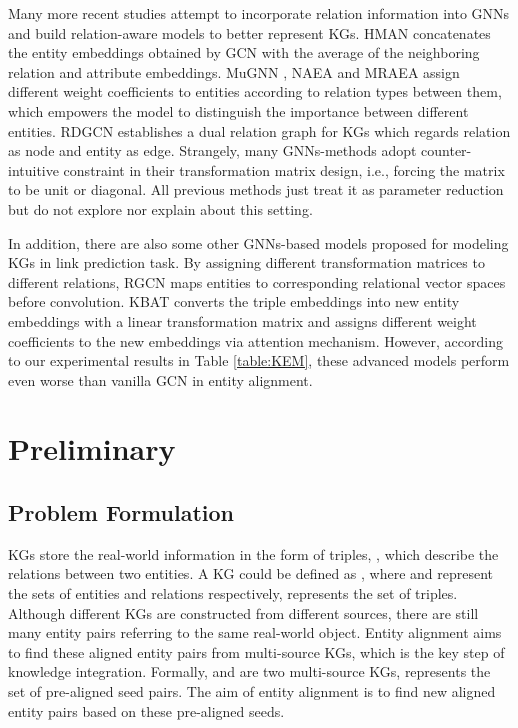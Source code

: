 \documentclass[sigconf,camera-ready]{acmart}
\begin{document}
Many more recent studies attempt to incorporate relation information into GNNs and build relation-aware models to better represent KGs.
HMAN \cite{yang2019aligning} concatenates the entity embeddings obtained by GCN with the average of the neighboring relation and attribute embeddings.
MuGNN \cite{DBLP:conf/acl/CaoLLLLC19}, NAEA \cite{DBLP:conf/ijcai/ZhuZ0TG19} and MRAEA \cite{DBLP:conf/wsdm/MaoWXLW20} assign different weight coefficients to entities according to relation types between them, which empowers the model to distinguish the importance between different entities.
RDGCN \cite{DBLP:conf/ijcai/WuLF0Y019} establishes a dual relation graph for KGs which regards relation as node and entity as edge.
Strangely, many GNNs-methods \cite{DBLP:conf/acl/CaoLLLLC19,DBLP:conf/emnlp/WangLLZ18,li-etal-2019-semi,yang2019aligning,DBLP:conf/wsdm/MaoWXLW20} adopt counter-intuitive constraint in their transformation matrix design,
i.e., forcing the matrix to be unit or diagonal.
All previous methods just treat it as parameter reduction but do not explore nor explain about this setting.

In addition, there are also some other GNNs-based models proposed for modeling KGs in link prediction task.
By assigning different transformation matrices to different relations, RGCN \cite{DBLP:conf/esws/SchlichtkrullKB18} maps entities to corresponding relational vector spaces before convolution.
KBAT \cite{DBLP:conf/acl/NathaniCSK19} converts the triple embeddings into new entity embeddings with a linear transformation matrix and assigns different weight coefficients to the new embeddings via attention mechanism.
However, according to our experimental results in Table \ref{table:KEM}, these advanced models perform even worse than vanilla GCN in entity alignment.



\section{Preliminary}
\subsection{Problem Formulation}
KGs store the real-world information in the form of triples, 
, which describe the relations between two entities.
A KG could be defined as , where  and  represent the sets of entities and relations respectively,  represents the set of triples.
Although different KGs are constructed from different sources, there are still many entity pairs referring to the same real-world object.
Entity alignment aims to find these aligned entity pairs from multi-source KGs, which is the key step of knowledge integration.
Formally,  and  are two multi-source KGs,  represents the set of pre-aligned seed pairs.
The aim of entity alignment is to find new aligned entity pairs based on these pre-aligned seeds.
\end{document}
